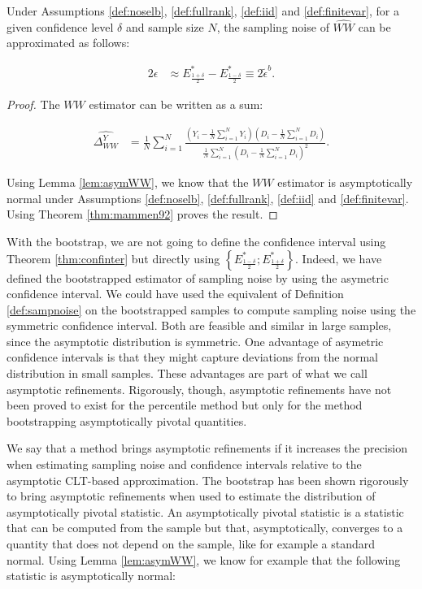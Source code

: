 \documentclass[]{book}
\theoremstyle{definition}
\theoremstyle{definition}
\theoremstyle{definition}
\theoremstyle{remark}
\let\BeginKnitrBlock\begin \let\EndKnitrBlock\end
\begin{document}
\BeginKnitrBlock{theorem}[Bootstrapped Estimate of Sampling Noise of WW]
\protect\hypertarget{thm:bootnoiseWW}{}{\label{thm:bootnoiseWW} \iffalse (Bootstrapped Estimate of Sampling Noise of WW) \fi{} }Under Assumptions \ref{def:noselb}, \ref{def:fullrank}, \ref{def:iid} and \ref{def:finitevar}, for a given confidence level \(\delta\) and sample size \(N\), the sampling noise of \(\hat{WW}\) can be approximated as follows:

\begin{align*}
2\epsilon & \approx E^*_{\frac{1+\delta}{2}}-E^*_{\frac{1-\delta}{2}} \equiv 2\tilde{\epsilon}^b.
\end{align*}
\EndKnitrBlock{theorem}

\BeginKnitrBlock{proof}
\iffalse{} {Proof. } \fi{}The \(WW\) estimator can be written as a sum:

\begin{align*}
\hat{\Delta^Y_{WW}} & = \frac{1}{N}\sum_{i=1}^N\frac{\left(Y_i-\frac{1}{N}\sum_{i=1}^NY_i\right)\left(D_i-\frac{1}{N}\sum_{i=1}^ND_i\right)}{\frac{1}{N}\sum_{i=1}^N\left(D_i-\frac{1}{N}\sum_{i=1}^ND_i\right)^2}.
\end{align*}

Using Lemma \ref{lem:asymWW}, we know that the \(WW\) estimator is asymptotically normal under Assumptions \ref{def:noselb}, \ref{def:fullrank}, \ref{def:iid} and \ref{def:finitevar}.
Using Theorem \ref{thm:mammen92} proves the result.
\EndKnitrBlock{proof}

\BeginKnitrBlock{remark}
\iffalse{} {Remark. } \fi{}With the bootstrap, we are not going to define the confidence interval using Theorem \ref{thm:confinter} but directly using \(\left\{E^*_{\frac{1-\delta}{2}};E^*_{\frac{1+\delta}{2}}\right\}\).
Indeed, we have defined the bootstrapped estimator of sampling noise by using the asymetric confidence interval.
We could have used the equivalent of Definition \ref{def:sampnoise} on the bootstrapped samples to compute sampling noise using the symmetric confidence interval.
Both are feasible and similar in large samples, since the asymptotic distribution is symmetric.
One advantage of asymetric confidence intervals is that they might capture deviations from the normal distribution in small samples.
These advantages are part of what we call asymptotic refinements.
Rigorously, though, asymptotic refinements have not been proved to exist for the percentile method but only for the method bootstrapping asymptotically pivotal quantities.
\EndKnitrBlock{remark}

\BeginKnitrBlock{remark}
\iffalse{} {Remark. } \fi{}We say that a method brings asymptotic refinements if it increases the precision when estimating sampling noise and confidence intervals relative to the asymptotic CLT-based approximation.
The bootstrap has been shown rigorously to bring asymptotic refinements when used to estimate the distribution of asymptotically pivotal statistic.
An asymptotically pivotal statistic is a statistic that can be computed from the sample but that, asymptotically, converges to a quantity that does not depend on the sample, like for example a standard normal.
Using Lemma \ref{lem:asymWW}, we know for example that the following statistic is asymptotically normal:
\EndKnitrBlock{remark}
\end{document}
